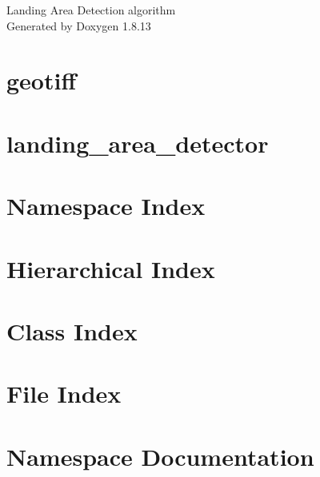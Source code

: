 \documentclass[twoside]{book}
\newcommand{\+}{\discretionary{\mbox{\scriptsize$\hookleftarrow$}}{}{}}
\newcommand{\clearemptydoublepage}{%
  \newpage{\pagestyle{empty}\cleardoublepage}%
}
\begin{document}
\hypersetup{pageanchor=false,
             bookmarksnumbered=true,
             pdfencoding=unicode
            }
\begin{titlepage}
\vspace*{7cm}
\begin{center}%
{\Large Landing Area Detection algorithm }\\
\vspace*{1cm}
{\large Generated by Doxygen 1.8.13}\\
\end{center}
\end{titlepage}
\clearemptydoublepage
{}
\tableofcontents
\clearemptydoublepage
{}
\hypersetup{pageanchor=true}

\chapter{geotiff}
\label{md__home_cappelletto_github_self_landing_area_detector_external_geotiff__r_e_a_d_m_e}

\chapter{landing\+\_\+area\+\_\+detector}
\label{md__home_cappelletto_github_self_landing_area_detector__r_e_a_d_m_e}

\chapter{Namespace Index}

\chapter{Hierarchical Index}

\chapter{Class Index}

\chapter{File Index}

\chapter{Namespace Documentation}



\end{document}
